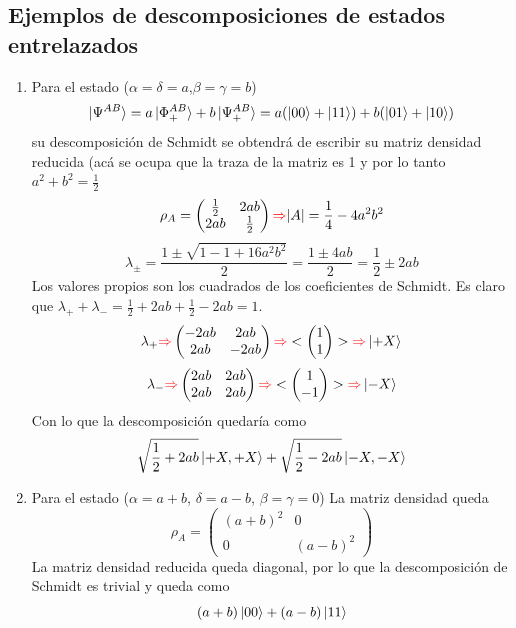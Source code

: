 \documentclass{book}
\begin{document}
\subsection{Ejemplos de descomposiciones de estados entrelazados}
\begin{enumerate}
    \item Para el estado ($\alpha=\delta=a$,$\beta=\gamma=b$)$$\ket{\Psi^{AB}}=a\ket{\Phi^{AB}_+}+b\ket{\Psi^{AB}_+}=a(\ket{00}+\ket{11})+b(\ket{01}+\ket{10})$$ su descomposición de Schmidt se obtendrá de escribir su matriz densidad reducida (acá se ocupa que la traza de la matriz es 1 y por lo tanto $a^2+b^2=\frac{1}{2}$
    $$ \rho_A=\begin{pmatrix} \frac{1}{2}& 2ab\\ 2ab &\frac{1}{2}\end{pmatrix} \textcolor{red}{\Rightarrow} \lvert A\rvert=\frac{1}{4}-4a^2b^2$$ $$\lambda_\pm=\frac{1\pm\sqrt{1-1+16a^2b^2}}{2}=\frac{1\pm4ab}{2}=\frac{1}{2}\pm 2ab$$
    Los valores propios son los cuadrados de los coeficientes de Schmidt. Es claro que $\lambda_++\lambda_-=\frac{1}{2}+2ab+\frac{1}{2}-2ab=1$. 
    $$\lambda_+\textcolor{red}{\Rightarrow}\begin{pmatrix}-2ab&2ab\\2ab&-2ab\end{pmatrix}\textcolor{red}{\Rightarrow}<\begin{pmatrix} 1\\1\end{pmatrix}>\textcolor{red}{\Rightarrow} \ket{+X}$$
    $$\lambda_-\textcolor{red}{\Rightarrow}\begin{pmatrix}2ab&2ab\\2ab&2ab\end{pmatrix}\textcolor{red}{\Rightarrow} <\begin{pmatrix}1\\ -1\end{pmatrix}>\textcolor{red}{\Rightarrow} \ket{-X}$$ Con lo que la descomposición quedaría como 
    $$ \sqrt{\frac{1}{2}+2ab}\ket{+X,+X}+\sqrt{\frac{1}{2}-2ab}\ket{-X,-X}$$
    \item Para el estado ($\alpha=a+b$, $\delta=a-b$, $\beta=\gamma=0$) 
    La matriz densidad queda
    $$ \rho_A=\begin{pmatrix} (a+b)^2& 0\\ 0 & (a-b)^2 \end{pmatrix}$$ La matriz densidad reducida queda diagonal, por lo que la descomposición de Schmidt es trivial y queda como
    $$ (a+b)\ket{00}+(a-b)\ket{11}$$
\end{enumerate}
\end{document}
